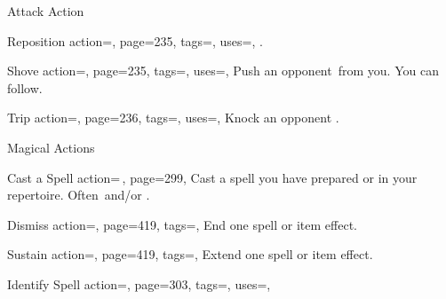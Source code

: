 \begin{PageBackLandscape}
\begin{TablesHalf}{\backTableHeight}
\begin{Table}{Attack Action}
\begin{entry}{Reposition}{%
                action=,
                page=235,
                tags=\Attack,
                uses=\AthleticsFortitude,
            }
                .
            \end{entry}
            \begin{entry}{Shove}{%
                action=,
                page=235,
                tags=\Attack,
                uses=\AthleticsFortitude,
            }
                Push an opponent \,\Feet from you. You can follow. \hfill
            \end{entry}
            \begin{entry}{Trip}{%
                action=,
                page=236,
                tags=\Attack,
                uses=\AthleticsReflex,
            }
                Knock an opponent \Prone.\hfill
                \quad{}
            \end{entry}
        \end{Table}
        \TableSpace
        \begin{Table}{Magical Actions}
            \begin{entry}{Cast a Spell}{%
                action={\,\sffamily{}},
                page=299,
            }
                Cast a spell you have prepared or in your repertoire. Often \Manipulate\,and/or \Concentrate.\hfill
            \end{entry}
            \begin{entry}{Dismiss}{%
                action=,
                page=419,
                tags=\Concentrate,
            }
                End one spell or item effect.
            \end{entry}
            \begin{entry}{Sustain}{%
                action=,
                page=419,
                tags=\Concentrate,
            }
                Extend one spell or item effect.\hfill
            \end{entry}
            \begin{entry}{Identify Spell}{%
                action=,
                page=303,
                tags=\Concentrate,
                uses={\MagicalSkill[tags={S}]},
            }

\end{entry}
\end{Table}
\end{TablesHalf}
\end{PageBackLandscape}
